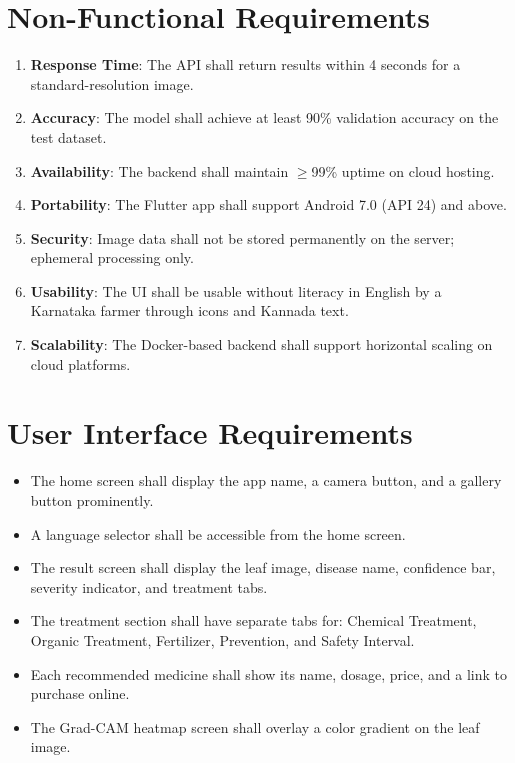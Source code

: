 \documentclass[12pt,a4paper]{report}
\begin{document}
\section{Non-Functional Requirements}
\begin{enumerate}
    \item \textbf{Response Time}: The API shall return results within 4 seconds for a standard-resolution image.
    \item \textbf{Accuracy}: The model shall achieve at least 90\% validation accuracy on the test dataset.
    \item \textbf{Availability}: The backend shall maintain $\geq$99\% uptime on cloud hosting.
    \item \textbf{Portability}: The Flutter app shall support Android 7.0 (API 24) and above.
    \item \textbf{Security}: Image data shall not be stored permanently on the server; ephemeral processing only.
    \item \textbf{Usability}: The UI shall be usable without literacy in English by a Karnataka farmer through icons and Kannada text.
    \item \textbf{Scalability}: The Docker-based backend shall support horizontal scaling on cloud platforms.
\end{enumerate}

\section{User Interface Requirements}
\begin{itemize}
    \item The home screen shall display the app name, a camera button, and a gallery button prominently.
    \item A language selector shall be accessible from the home screen.
    \item The result screen shall display the leaf image, disease name, confidence bar, severity indicator, and treatment tabs.
    \item The treatment section shall have separate tabs for: Chemical Treatment, Organic Treatment, Fertilizer, Prevention, and Safety Interval.
    \item Each recommended medicine shall show its name, dosage, price, and a link to purchase online.
    \item The Grad-CAM heatmap screen shall overlay a color gradient on the leaf image.
\end{itemize}
\end{document}
